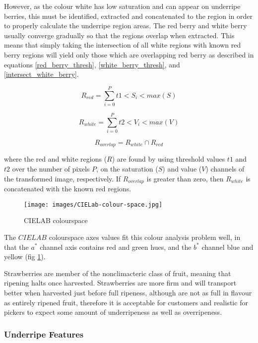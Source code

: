 \documentclass[conference]{IEEEtran}
\begin{document}
However, as the colour white has low saturation and can appear on underripe berries, this must be identified, extracted and concatenated to the region in order to properly calculate the underripe region areas. The red berry and white berry usually converge gradually so that the regions overlap when extracted. This means that simply taking the intersection of all white regions with known red berry regions will yield only those which are overlapping red berry as described in equations \ref{red_berry_thresh}, \ref{white_berry_thresh}, and \ref{intersect_white_berry}.

\begin{equation}
	R_{red} = \sum_{i=0}^{P}t1<S_i<max(S)
	\label{red_berry_thresh}
\end{equation}

\begin{equation}
	R_{white} = \sum_{i=0}^{P}t2<V_i<max(V)
	\label{white_berry_thresh}
\end{equation}

\begin{equation}
	R_{overlap} = R_{white} \cap R_{red}
	\label{intersect_white_berry}
\end{equation}

where the red and white regions ($R$) are found by using threshold values $t1$ and $t2$ over the number of pixels $P$, on the saturation ($S$) and value ($V$) channels of the transformed image, respectively. If $R_{overlap}$ is greater than zero, then $R_{white}$ is concatenated with the known red regions. 
 

\begin{figure}[h]
	\centering
	\texttt{[image: images/CIELab-colour-space.jpg]}
	\caption{CIELAB colourspace}
	\label{fig:lab}
\end{figure}


The $CIELAB$ colourspace axes values fit this colour analysis problem well, in that the $a^*$ channel axis contains red and green hues, and the $b^*$ channel blue and yellow (fig \ref{fig:lab}). 

Strawberries are member of the nonclimacteric class of fruit, meaning that ripening halts once harvested. Strawberries are more firm and will transport better when harvested just before full ripeness, although are not as full in flavour as entirely ripened fruit\cite{artur}, therefore it is acceptable for customers and realistic for pickers to expect some amount of underripeness as well as overripeness.

\subsubsection{Underripe Features}
\end{document}
